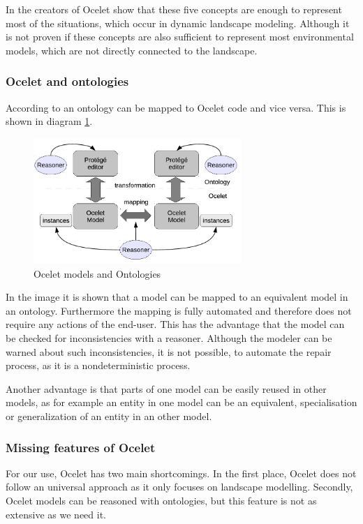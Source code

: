 \par
In \autocite{dsl:ocelet-design} the creators of Ocelet show that these five concepts are enough to represent most of the situations, which occur in dynamic landscape modeling. Although it is not proven if these concepts are also sufficient to represent most environmental models, which are not directly connected to the landscape.

\subsubsection{Ocelet and ontologies}
\par
According to \autocite{dsl:ocelet-design} an ontology can be mapped to Ocelet code and vice versa. This is shown in diagram \ref{fig:ocelet_and_ontologies}.
\begin{figure}[h]
	\centering
	\includegraphics[width=0.7\textwidth]{pics/ocelet/ocelet_and_ontologies.png}
	\caption{Ocelet models and Ontologies  \label{fig:ocelet_and_ontologies}}	
\end{figure}
\par
In the image it is shown that a model can be mapped to an equivalent model in an ontology. Furthermore the mapping is fully automated and therefore does not require any actions of the end-user. This has the advantage that the model can be checked for inconsistencies with a reasoner. Although the modeler can be warned about such inconsistencies, it is not possible, to automate the repair process, as it is a nondeterministic process.  
\par
Another advantage is that parts of one model can be easily reused in other models, as for example an entity in one model can be an equivalent, specialisation or generalization of an entity in an other model.

\subsubsection{Missing features of Ocelet}
\par
For our use, Ocelet has two main shortcomings. In the first place, Ocelet does not follow an universal approach as it only focuses on landscape modelling. Secondly, Ocelet models can be reasoned with ontologies, but this feature is not as extensive as we need it.


